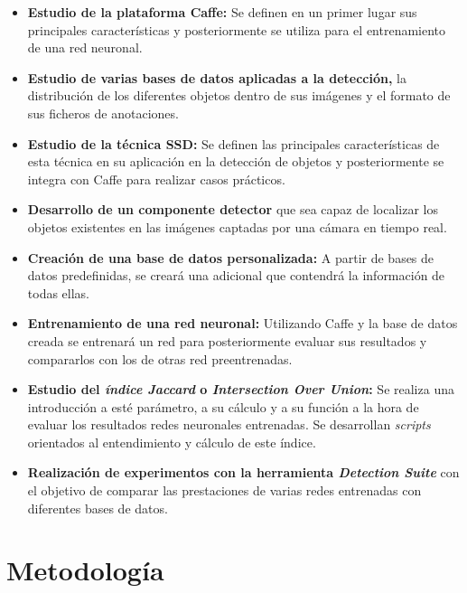 \documentclass[a4paper, 12pt, spanish, chapterprefix, numbers=noenddot]{book}
\begin{document}
\begin{itemize}
\item \textbf{Estudio de la plataforma Caffe:} Se definen en un primer lugar sus principales características y posteriormente se utiliza para el entrenamiento de una red neuronal.
\item \textbf{Estudio de varias bases de datos aplicadas a la detección,} la distribución de los diferentes objetos dentro de sus imágenes y el formato de sus ficheros de anotaciones.
\item \textbf{Estudio de la técnica SSD: } Se definen las principales características de esta técnica en su aplicación en la detección de objetos y posteriormente se integra con Caffe para realizar casos prácticos.
\item \textbf{Desarrollo de un componente detector} que sea capaz de localizar los objetos existentes en las imágenes captadas por una cámara en tiempo real.
\item \textbf{Creación de una base de datos personalizada:} A partir de bases de datos predefinidas, se creará una adicional que contendrá la información de todas ellas.
\item \textbf{Entrenamiento de una red neuronal:} Utilizando Caffe y la base de datos creada se entrenará un red para posteriormente evaluar sus resultados y compararlos con los de otras red preentrenadas.
\begin{comment}
\item \textbf{Desarrollo de \textit{scripts} para el cáculo \textit{índice Jaccard} o \textit{Intersection Over Union}} utilizando un mismo conjunto de imágenes de prueba sobre una misma red neuronal entrenada con diferentes bases de datos. De esta manera se podrán comparar las prestaciones de cada uno de las redes entrenadas.
\end{comment}
\item \textbf{Estudio del \textit{índice Jaccard} o \textit{Intersection Over Union}:} Se realiza una introducción a esté parámetro, a su cálculo y a su función a la hora de evaluar los resultados redes neuronales entrenadas. Se desarrollan \textit{scripts} orientados al entendimiento y cálculo de este índice.
\item \textbf{Realización de experimentos con la herramienta \textit{Detection Suite}} con el objetivo de comparar las prestaciones de varias redes entrenadas con diferentes bases de datos.
\end{itemize}

\section{Metodología}
\end{document}
